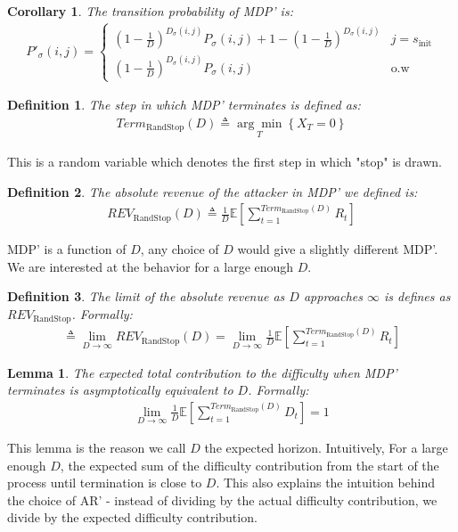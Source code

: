 \documentclass{article}
\newcommand{\E}[1]{\mathbb{E} \left[ #1 \right]}
\newcommand{\argmin}[2]{\underset{#1}{\arg \min} \left\{ #2 \right\}}
\newcommand{\revaux}{\textit{REV}_\text{RandStop}}
\newcommand{\termaux}{\textit{Term}_\text{RandStop}}
\newtheorem{definition}{Definition}
\newtheorem{corollary}[theorem]{Corollary}
\newtheorem{lemma}[theorem]{Lemma}
\begin{document}
\begin{corollary}\label{mdp_prime_transition_p}
    The transition probability of MDP' is:
    \begin{gather*}
        P'_\sigma(i,j) =
        \begin{cases}
            \left( 1 - \frac{1}{D} \right)^{D_\sigma(i,j)} P_\sigma(i,j) + 1 - \left( 1 - \frac{1}{D} \right)^{D_\sigma(i,j)} & j = s_\text{init} \\
            \left( 1 - \frac{1}{D} \right)^{D_\sigma(i,j)} P_\sigma(i,j) & \text{o.w}
        \end{cases}
    \end{gather*}
\end{corollary}

\begin{definition}\label{term_def}
    The step in which MDP' terminates is defined as:
    \begin{gather*}
        \termaux(D) \triangleq \argmin{T}{X_T = 0}
    \end{gather*}
\end{definition}
This is a random variable which denotes the first step in which "stop" is drawn.

\begin{definition}
    The absolute revenue of the attacker in MDP' we defined is:
    \begin{gather*}
         \revaux(D) \triangleq \frac{1}{D}\E{\sum\limits_{t=1}^{\termaux(D)} R_t}
    \end{gather*}
\end{definition}

MDP' is a function of $D$, any choice of $D$ would give a slightly different MDP'. We are interested at the behavior for a large enough $D$.
\begin{definition}\label{ar_prime_def} The limit of the absolute revenue as $D$ approaches $\infty$ is defines as $\revaux$. Formally:
    \begin{gather*}
          \triangleq \lim\limits_{D\to\infty} \revaux(D) = \lim\limits_{D\to\infty} \frac{1}{D}\E{\sum\limits_{t=1}^{\termaux(D)} R_t}
    \end{gather*}
\end{definition}

\begin{lemma}\label{diff_cont_lemma}
    The expected total contribution to the difficulty when MDP' terminates is asymptotically equivalent to $D$. Formally:
    \begin{gather*}
        \lim\limits_{D\to\infty} \frac{1}{D} \E{\sum\limits_{t=1}^{\termaux(D)} D_t} = 1
    \end{gather*}
\end{lemma}
This lemma is the reason we call $D$ the expected horizon. Intuitively, For a large enough $D$, the expected sum of the difficulty contribution from the start of the process until termination is close to $D$. This also explains the intuition behind the choice of AR' - instead of dividing by the actual difficulty contribution, we divide by the expected difficulty contribution.
\end{document}
